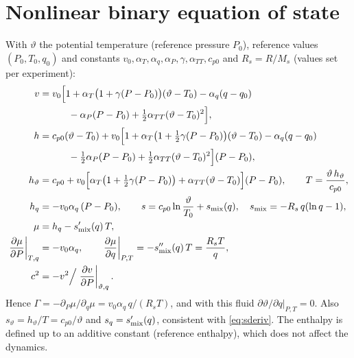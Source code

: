 \documentclass[11pt,a4paper]{article}
\newcommand{\vt}{\vartheta}                    %
\newcommand{\hth}{{h_{\vartheta}}}               %
\newcommand{\hq}{{h_q}}                          %
\newcommand{\pdc}[3]{\left.\frac{\partial #1}{\partial #2}\right|_{#3}}
\begin{document}
\section{Nonlinear binary equation of state}\label{app:eos}
With $\vt$ the potential temperature (reference pressure $P_0$), reference values $(P_0,T_0,q_0)$ and constants
$v_0,\alpha_T,\alpha_q,\alpha_P,\gamma,\alpha_{TT},c_{p0}$ and $R_s=R/M_s$ (values set per experiment):
\begin{align}
  v &= v_0\Big[1+\alpha_T\big(1+\gamma(P-P_0)\big)(\vt-T_0)-\alpha_q(q-q_0)\nonumber\\
    &\qquad\quad-\alpha_P(P-P_0)+\tfrac12\alpha_{TT}(\vt-T_0)^2\Big],\\
  h &= c_{p0}(\vt-T_0)+v_0\Big[1+\alpha_T\big(1+\tfrac12\gamma(P-P_0)\big)(\vt-T_0)-\alpha_q(q-q_0)\nonumber\\
    &\qquad\quad-\tfrac12\alpha_P(P-P_0)+\tfrac12\alpha_{TT}(\vt-T_0)^2\Big](P-P_0),\\
  \hth &= c_{p0}+v_0\Big[\alpha_T\big(1+\tfrac12\gamma(P-P_0)\big)+\alpha_{TT}(\vt-T_0)\Big](P-P_0),\qquad T=\frac{\vt\,\hth}{c_{p0}},\\
  \hq &= -v_0\alpha_q\,(P-P_0),\qquad s = c_{p0}\ln\frac{\vt}{T_0}+s_{\rm mix}(q),\quad s_{\rm mix}=-R_s\,q(\ln q-1),\\
  \mu &= \hq - s_{\rm mix}'(q)\,T,\\
  \pdc{\mu}{P}{T,q}&=-v_0\alpha_q,\qquad\pdc{\mu}{q}{P,T}=-s_{\rm mix}''(q)\,T=\frac{R_sT}{q},\\
  c^2 &= -v^2\Big/\pdc{v}{P}{\vt,q}.
\end{align}
Hence $\Gamma=-\partial_P\mu/\partial_q\mu=v_0\alpha_q\,q/(R_sT)$, and with this fluid $\partial\vt/\partial q|_{P,T}=0$. Also $s_\vt=\hth/T=c_{p0}/\vt$ and $s_q=s_{\rm mix}'(q)$, consistent with \eqref{eq:sderiv}.
The enthalpy is defined up to an additive constant (reference enthalpy), which does not affect the dynamics.
\end{document}
